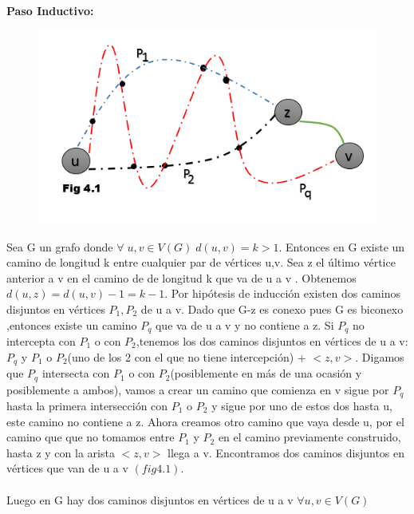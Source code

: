 \documentclass{article}
\begin{document}
    \noindent \textbf{Paso Inductivo:}\\
    \begin{figure}[H]
        \includegraphics[scale = 0.327]{img/4fig1.png}
        \centering
    \end{figure}
    \noindent Sea G un grafo donde $\forall\; u,v\in V(G)\; d(u,v)=k>1$. Entonces en G existe un camino de longitud k entre 
    cualquier par de v\'ertices u,v. Sea z el \'ultimo v\'ertice anterior a v en el camino de de longitud k que va de
    u a v . Obtenemos $d(u,z)=d(u,v)-1=k-1$. Por hip\'otesis de inducci\'on existen dos caminos disjuntos en v\'ertices 
    $P_{1},P_{2}$ de u a v. Dado que G-z es conexo pues G es biconexo ,entonces existe un camino $P_{q}$ que va de u a v
    y no contiene a z. Si $P_{q}$ no intercepta con $P_{1}$ o con $P_{2}$,tenemos los dos caminos disjuntos en v\'ertices
    de u a v: $P_{q}$ y $P_{1}$ o $P_{2}$(uno de los 2 con el que no tiene intercepci\'on) + $<z,v>$. Digamos que $P_{q}$ intersecta 
    con $P_{1}$ o con $P_{2}$(posiblemente en m\'as de una ocasi\'on y posiblemente a ambos), vamos a crear un camino que comienza en v sigue por $P_{q}$ hasta la primera intersecci\'on con
    $P_{1}$ o $P_{2}$ y sigue por uno de estos dos hasta u, este camino no contiene a z. Ahora creamos  otro camino que vaya 
    desde u, por el camino que que no tomamos entre $P_{1}$ y $P_{2}$ en el camino previamente construido,  hasta z y con la arista $<z,v>$ llega 
    a v. Encontramos dos caminos disjuntos en v\'ertices que van de u a v $(fig4.1)$.\\\\
    Luego en G hay dos caminos disjuntos en v\'ertices de u a v $\forall u,v \in V(G)$\\\\
 
\end{document}
